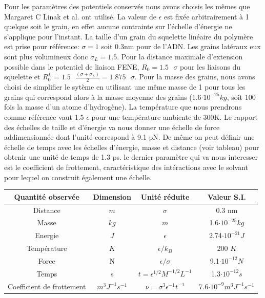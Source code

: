 \documentclass[a4paper,11pt]{article}
\begin{document}
Pour les paramètres des potentiels conservés nous avons choisis les mêmes que Margaret C Linak et al. \cite{jchem} ont utilisé. La valeur de $\epsilon$ est fixée arbitrairement à 1 quelque soit le grain, en effet aucune contrainte sur l'échelle d'énergie ne s'applique pour l'instant. La taille d'un grain du squelette linéaire du polymère est prise pour référence: $\sigma=1$ soit 0.3nm pour de l'ADN. Les grains latéraux eux sont plus volumineux donc $\sigma_{L}=1.5$. Pour la distance maximale d'extension possible dans le potentiel de liaison FENE, $R_0=1.5\text{ } \sigma$ pour les liaisons du squelette et $R_0^{L}=1.5 \text{ }\frac{(\sigma+\sigma_{L})}{2} = 1.875\text{ } \sigma$. Pour la masse des grains, nous avons choisi  de simplifier le sytème en utilisant une même masse de 1 pour tous les grains qui correspond alors à la masse moyenne des grains (1.6$\cdot 10^{-25} kg$, soit 100 fois la masse d'un atome d'hydrogène). La température que nous prendrons comme référence vaut 1.5 $\epsilon$ pour une température ambiente de 300K. Le rapport des échelles de taille et d'énergie va nous donner une échelle de force addimensionnée dont l'unité correspond à 9.1 pN. De même on peut définir une échelle de temps avec les échelles d'énergie, masse et distance (voir tableau) pour obtenir une unité de temps de 1.3 ps. le dernier paramètre qui va nous interesser est le coefficient de frottement, caractéristique des intéractions avec le solvant pour lequel on construit également une échelle.




\begin{center}


\begin{tabular}{|c|c|c|c|}
  \hline
  Quantité observée & Dimension & Unité réduite & Valeur S.I. \\
  \hline
  Distance & $m$ & $\sigma$ & 0.3 nm\\
  Masse & $kg$ & $m$ & 1.6$\cdot 10^{-25} kg$ \\
  Energie & $J$ & $\epsilon$ & 2.74$\cdot 10^{-21} J$\\
  Température & $K$ & $\epsilon/k_B$ & 200 $K$\\
  Force & N  & $\epsilon/\sigma$ & 9.1$\cdot 10^{-12} N$ \\
  Temps & s & $t=\epsilon^{1/2} M^{-1/2} L^{-1} $& 1.3$\cdot 10^{-12} s$\\
  Coefficient de frottement & $ m^3 J^{-1} s^{-1}$ & $ \nu= \sigma^3 \epsilon^{-1} t^{-1}$ & 7.6$\cdot 10^{-9} m^3J^{-1}s^{-1}$\\
  
  \hline
\end{tabular}

\end{center}
\end{document}
